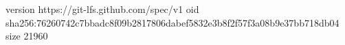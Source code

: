version https://git-lfs.github.com/spec/v1
oid sha256:76260742c7bbadc8f09b2817806dabef5832e3b8f2f57f3a08b9e37bb718db04
size 21960
